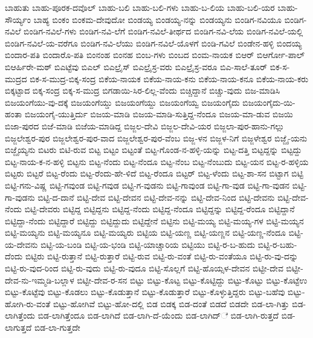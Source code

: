 ಬಾಹುತು
ಬಾಹು-ಪೂರಕ-ದವೊಲ್
ಬಾಹು-ಬಲಿ
ಬಾಹು-ಬಲಿ-ಗಳು
ಬಾಹು-ಬ-ಲಿಯ
ಬಾಹು-ಬಲಿ-ಯರ
ಬಾಹು-ಸೌರ್ಯ್ಯಂ
ಬಾಹ್ಯ
ಬಿಂಕಂ
ಬಿಂಕಮ-ದೇವುದೋ
ಬಿಂಡಯ್ಯ
ಬಿಂಡಯ್ಯ-ನನ್ನು
ಬಿಂಡಯ್ಯನು
ಬಿಂಡಿಗ-ನವಿಯೂ
ಬಿಂಡಿಗ-ನವಿಲೆ
ಬಿಂಡಿಗ-ನವಿಲೆ-ಗಳು
ಬಿಂಡಿಗ-ನವಿ-ಲೆಗೆ
ಬಿಂಡಿಗ-ನವಿಲೆ-ತೀರ್ಥದ
ಬಿಂಡಿಗ-ನವಿ-ಲೆಯ
ಬಿಂಡಿಗ-ನವಿಲೆ-ಯಲ್ಲಿ
ಬಿಂಡಿಗ-ನವಿಲೆ-ಯ-ವರೆಗೂ
ಬಿಂಡಿಗ-ನವಿ-ಲೆಯು
ಬಿಂಡಿಗ-ನವಿಲೆ-ಯೊಳಗೆ
ಬಿಂಡಿ-ಗವಿಲೆ
ಬಿಂಡೇನ-ಹಳ್ಳಿ
ಬಿಂದಯ್ಯ
ಬಿಂದಾರ-ಪತಿ
ಬಿಂದಾರೊ-ಪತಿ
ಬಿಂನಂಹ
ಬಿಂನಹ
ಬಿಂಬ-ಗಳು
ಬಿಂಬದ
ಬಿಂಮ-ನಾಯಕ
ಬಿಆರ್
ಬಿಆರ್ಗೋ-ಪಾಲ್
ಬಿಆರ್ಹಿರೇ-ಮಠ್
ಬಿಎಟ್ಟೆವು
ಬಿಎಲ್
ಬಿಎಲ್ರೈಸ್
ಬಿಎಲ್ರೈಸ್ರ-ವರು
ಬಿಎಲ್ರೈಸ್ರ-ವರೂ
ಬಿಎ-ಸಾಲೆ-ತೂರ್
ಬಿಕ-ಸ-ಮುದ್ರದ
ಬಿಕ-ಸ-ಮುದ್ರ-ಬಿಕ್ಕ-ಸಂದ್ರ
ಬಿಕೆಯ-ನಾಯಕ
ಬಿಕೆಯ-ನಾಯ-ಕನು
ಬಿಕೆಯ-ನಾಯ-ಕನೂ
ಬಿಕೆಯ-ನಾಯ-ಕರು
ಬಿಕ್ಕಟ್ಟಾದ
ಬಿಕ್ಕ-ಸಂದ್ರ
ಬಿಕ್ಕ-ಸ-ಮುದ್ರ
ಬಿಗಡಾಯಿ-ಸಿರ-ಲಿಲ್ಲ-ವೆಂದು
ಬಿಚ್ಚಿದ್ದಾನೆ
ಬಿಚ್ಚು-ವುದು
ಬಿಜ-ಮಾಡಿಸಿ
ಬಿಜಯಂಗೆಯು-ವು-ದಕ್ಕೆ
ಬಿಜಯಂಗೆಯ್ಡು
ಬಿಜಯಂಗೆಯ್ದು
ಬಿಜಯಂಗೆಯ್ವ
ಬಿಜಯಂಗೈದು
ಬಿಜಯಂಗೈದು-ಯಿ-ಹಂತಾ
ಬಿಜಯಂಗೈ-ಯುತ್ತಿರ್ದು
ಬಿಜಯ-ಮಾಡಿ
ಬಿಜಯ-ಮಾಡಿ-ಸುತ್ತಿದ್ದ-ನೆಂದೂ
ಬಿಜಯ-ಮಾ-ಡುವ
ಬಿಜಯಿ
ಬಿಜಾ-ಪುರದ
ಬಿಜೆ-ಮಾಡಿ
ಬಿಜೆಯ-ಮಾಡಿದ್ದ
ಬಿಜ್ಜಲ-ದೇವಿ
ಬಿಜ್ಜಲ-ದೇವಿ-ಯರ
ಬಿಜ್ಜಲಾ-ಪುರ-ಹಾನು-ಗಲ್ಲು
ಬಿಜ್ಜಲೇಶ್ವರ-ಪುರ
ಬಿಜ್ಜಲೇಶ್ವರ-ಪುರ-ವಾದ
ಬಿಜ್ಜಲೇಶ್ವರ-ಪುರ-ವೆಂಬ
ಬಿಜ್ಜ-ಳನ
ಬಿಜ್ಜಳ-ನಿಗೆ
ಬಿಜ್ಜಳೇಶ್ವರ
ಬಿಜ್ಜೈ-ಯನು
ಬಿಜ್ಜೈಯ್ಯನು
ಬಿಟರು
ಬಿಟಿ-ರುವ
ಬಿಟ್ಟ
ಬಿಟ್ಟಂ
ಬಿಟ್ಟಂತೆ
ಬಿಟ್ಟ-ಗೊಂಡ-ನ-ಹಳ್ಳಿ-ಯನ್ನು
ಬಿಟ್ಟ-ದತ್ತಿ
ಬಿಟ್ಟದ್ದನ್ನು
ಬಿಟ್ಟದ್ದು
ಬಿಟ್ಟ-ನಾಯ-ಕ-ನ-ಹಳ್ಳಿ
ಬಿಟ್ಟನು
ಬಿಟ್ಟ-ನೆಂದು
ಬಿಟ್ಟ-ನೆಂದೂ
ಬಿಟ್ಟ-ನೆಂಬ
ಬಿಟ್ಟ-ನೆಂಬುದು
ಬಿಟ್ಟ-ಯನ
ಬಿಟ್ಟ-ರ-ಹಳ್ಳಿಯ
ಬಿಟ್ಟರು
ಬಿಟ್ಟರೆ
ಬಿಟ್ಟ-ರೆಂದು
ಬಿಟ್ಟ-ರೆಂದು-ಹೇ-ಳಿದೆ
ಬಿಟ್ಟ-ರೆಂದೂ
ಬಿಟ್ಟರ್
ಬಿಟ್ಟ-ಳೆಂದು
ಬಿಟ್ಟ-ಶಾ-ಸನ
ಬಿಟ್ಟಾಗ
ಬಿಟ್ಟಿ
ಬಿಟ್ಟಿ-ಗನು-ವಿಷ್ಣ
ಬಿಟ್ಟಿ-ಗವುಂಡ
ಬಿಟ್ಟಿ-ಗವುಡ
ಬಿಟ್ಟಿ-ಗ-ವುಡನು
ಬಿಟ್ಟಿ-ಗಾವುಂಡ
ಬಿಟ್ಟಿ-ಗಾ-ವುಡ
ಬಿಟ್ಟಿ-ಗಾ-ವುಡನ
ಬಿಟ್ಟಿ-ಗಾ-ವುಡನು
ಬಿಟ್ಟಿ-ದ-ದಾನೆ
ಬಿಟ್ಟಿ-ದೇವ
ಬಿಟ್ಟಿ-ದೇವನ
ಬಿಟ್ಟಿ-ದೇವ-ನನ್ನು
ಬಿಟ್ಟಿ-ದೇವ-ನಿಂದ
ಬಿಟ್ಟಿ-ದೇವನು
ಬಿಟ್ಟಿ-ದೇವ-ನೆಂದು
ಬಿಟ್ಟಿ-ದೇವರು
ಬಿಟ್ಟಿದ್ದ
ಬಿಟ್ಟಿದ್ದನು
ಬಿಟ್ಟಿದ್ದ-ನೆಂದು
ಬಿಟ್ಟಿದ್ದ-ನೆಂದೂ
ಬಿಟ್ಟಿದ್ದನ್ನು
ಬಿಟ್ಟಿದ್ದ-ರೆಂದೂ
ಬಿಟ್ಟಿದ್ದಾನೆ
ಬಿಟ್ಟಿದ್ದಾ-ನೆಂದು
ಬಿಟ್ಟಿದ್ದಾರೆ
ಬಿಟ್ಟಿದ್ದು
ಬಿಟ್ಟಿದ್ದುದು
ಬಿಟ್ಟಿದ್ದೇನೆ
ಬಿಟ್ಟಿನು
ಬಿಟ್ಟಿ-ಮಯ್ಯ
ಬಿಟ್ಟಿ-ಮಯ್ಯ-ಗಳ
ಬಿಟ್ಟಿ-ಮಯ್ಯನ
ಬಿಟ್ಟಿ-ಮಯ್ಯನು
ಬಿಟ್ಟಿ-ಮಯ್ಯನೂ
ಬಿಟ್ಟಿ-ಮಯ್ಯರು
ಬಿಟ್ಟಿಯ
ಬಿಟ್ಟಿ-ಯಣ್ಣ
ಬಿಟ್ಟಿ-ಯಣ್ಣನ
ಬಿಟ್ಟಿ-ಯಣ್ಣ-ನೆಂದೂ
ಬಿಟ್ಟಿ-ಯ-ದೇವನು
ಬಿಟ್ಟಿ-ಯ-ಬಂಡಿ
ಬಿಟ್ಟಿ-ಯ-ಭಂಡಿ
ಬಿಟ್ಟಿ-ಯಾಚ್ಚಾರಿಯ
ಬಿಟ್ಟಿಯು
ಬಿಟ್ಟಿ-ರ-ಬ-ಹುದು
ಬಿಟ್ಟಿ-ರ-ಬಹು-ದೆಂದು
ಬಿಟ್ಟಿರು
ಬಿಟ್ಟಿ-ರುತ್ತಾನೆ
ಬಿಟ್ಟಿ-ರುತ್ತಾರೆ
ಬಿಟ್ಟಿ-ರುವ
ಬಿಟ್ಟಿ-ರು-ವಂತೆ
ಬಿಟ್ಟಿ-ರು-ವಂತೆಯೂ
ಬಿಟ್ಟಿ-ರು-ವು-ದನ್ನು
ಬಿಟ್ಟಿ-ರು-ವುದ-ರಿಂದ
ಬಿಟ್ಟಿ-ರು-ವುದು
ಬಿಟ್ಟಿ-ರು-ವುದೂ
ಬಿಟ್ಟಿ-ಸೊಲ್ಲಗೆ
ಬಿಟ್ಟಿ-ಹೊಯ್ಸಳ-ದೇವನ
ಬಿಟ್ಟೀ-ದೇವ
ಬಿಟ್ಟೀ-ದೇವ-ನು-ಇಮ್ಮಡಿ-ಬಲ್ಲಾಳ
ಬಿಟ್ಟೀ-ದೇವ-ರ-ಸನ
ಬಿಟ್ಟು
ಬಿಟ್ಟು-ಕೊಟ್ಟ
ಬಿಟ್ಟು-ಕೊಟ್ಟಿದ್ದು
ಬಿಟ್ಟು-ಕೊಟ್ಟು
ಬಿಟ್ಟು-ಕೊಟ್ಟೆಉ
ಬಿಟ್ಟು-ಕೊಟ್ಟೆವು
ಬಿಟ್ಟು-ಕೊಡಲು
ಬಿಟ್ಟು-ಕೊಡುತ್ತಾನೆ
ಬಿಟ್ಟು-ಕೊಡುತ್ತಾರೆ
ಬಿಟ್ಟು-ಕೊಳ್ಳುತ್ತಿದ್ದರು
ಬಿಟ್ಟು-ಬಹೆವು
ಬಿಟ್ಟು-ಹೋಗಿ-ರು-ವಂತೆ
ಬಿಟ್ಟು-ಹೋಗಿವೆ
ಬಿಟ್ಟು-ಹೋ-ದಲ್ಲಿ
ಬಿಡ
ಬಿಡಕ್ಕ
ಬಿಡ-ದಂತೆ
ಬಿಡದೆ
ಬಿಡದೇ
ಬಿಡ-ಲಾ-ಗಿತ್ತು
ಬಿಡ-ಲಾಗಿತ್ತೆಂದು
ಬಿಡ-ಲಾಗಿತ್ತೆಂದೂ
ಬಿಡ-ಲಾಗಿದೆ
ಬಿಡ-ಲಾಗಿ-ದೆ-ಯೆಂದು
ಬಿಡ-ಲಾಗಿದ್ೆ
ಬಿಡ-ಲಾಗಿ-ರುತ್ತದೆ
ಬಿಡ-ಲಾಗುತ್ತದೆ
ಬಿಡ-ಲಾ-ಗುತ್ತದೇ
